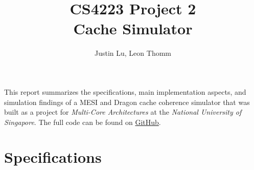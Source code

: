 \documentclass{article}
\begin{document}

\title{CS4223 Project 2\\Cache Simulator}
\author{Justin Lu, Leon Thomm}
\maketitle

\renewcommand\thesection{\arabic{section}}
\renewcommand\thesubsection{\thesection.\alph{subsection}}

This report summarizes the specifications, main implementation aspects, and simulation findings of a MESI and Dragon cache coherence simulator that was built as a project for \textit{Multi-Core Architectures} at the \textit{National University of Singapore}. The full code can be found on \href{https://github.com/leon-thomm/cache_simulator}{GitHub}.

\section{Specifications}
\end{document}

